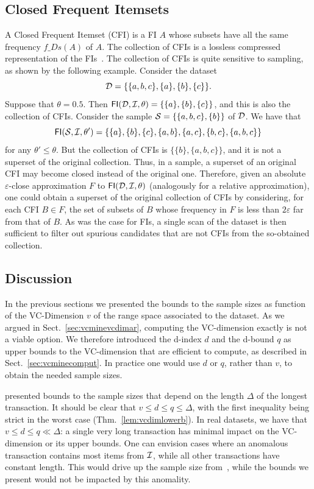 \subsection{Closed Frequent Itemsets}\label{sec:vcmineclosed}
A Closed Frequent Itemset (CFI) is a FI $A$ whose subsets have all the same frequency
$f\_Ds(A)$ of $A$. The collection of CFIs is a lossless compressed
representation of the FIs~\citep{CaldersRB06}. The collection of CFIs is quite
sensitive to sampling, as shown by the following example. Consider the %
dataset 
\[
  {\cal D}=\{\{a,b,c\}, \{a\}, \{b\}, \{c\}\}
  .
\]
Suppose that $\theta=0.5$. Then $\mathsf{FI}({\cal D},{\cal I},\theta)=\{
\{a\},\{b\},\{c\}\}$, and this is also the collection of CFIs. Consider the sample
${\cal S}=\{\{a,b,c\},\{b\}\}$ of ${\cal D}$. We have that
\[
\mathsf{FI}({\cal S},{\cal I},\theta')=\{\{a\},\{b\},\{c\},\{a,b\},\{a,c\},\{b,c\},\{a,b,c\}\}
\]
for any $\theta'\le\theta$. But the collection of CFIs is
$\{\{b\},\{a,b,c\}\}$, and it is not a superset of the original collection. Thus, in a
sample, a superset of an original CFI may become closed instead of the original one.
Therefore, given an absolute $\varepsilon$-close approximation $F$ to
$\mathsf{FI}({\cal D},{\cal I},\theta)$ (analogously for a relative approximation), one could
obtain a superset of the original collection of CFIs by considering, for each
CFI $B\in F$, the set of subsets of $B$ whose frequency in $F$ is less than
$2\varepsilon$ far from that of $B$. As was the case for FIs, a single scan of
the dataset is then sufficient to filter out spurious candidates that are not
CFIs from the so-obtained collection.

\subsection{Discussion}\label{sec:vcminediscussion}
In the previous sections we presented the bounds to the sample sizes as function
of the VC-Dimension $v$ of the range space associated to the dataset. As we argued
in Sect.~\ref{sec:vcminevcdimar}, computing the VC-dimension exactly is not a viable
option. We therefore introduced the d-index $d$ and the d-bound $q$ as upper
bounds to the VC-dimension that are efficient to compute, as described in
Sect.~\ref{sec:vcminecomput}. In practice one would use $d$ or $q$, rather than $v$,
to obtain the needed sample sizes. 

\citet{ChakaravarthyPS09} presented bounds to the sample sizes that depend on
the length $\Delta$ of the longest transaction. It should be clear that $v\le
d\le q \le \Delta$, with the first inequality being strict in the worst case
(Thm.~\ref{lem:vcdimlowerb}). In real datasets, we have that $v\le d\le q\ll
\Delta$: a single very long transaction has minimal impact on the VC-dimension
or its upper bounds. One can envision cases where an anomalous transaction
contains most items from ${\cal I}$, while all other transactions have constant
length. This would drive up the sample size from~\citep{ChakaravarthyPS09}, while
the bounds we present would not be impacted by this anomality.

